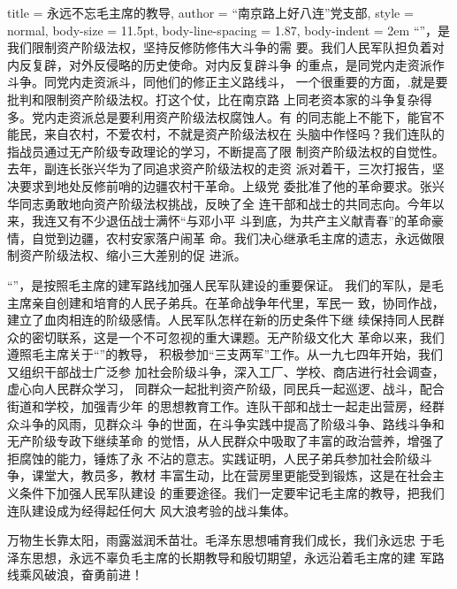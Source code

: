 \begin{hongqiarticle}{
        title  = {永远不忘毛主席的教导},
        author = {“南京路上好八连”党支部},
        style  = normal,
        body-size = 11.5pt,
        body-line-spacing = 1.87,
        body-indent = 2em
    }
    “”，是我们限制资产阶级法权，坚持反修防修伟大斗争的需
    要。我们人民军队担负着对内反复辟，对外反侵略的历史使命。对内反复辟斗争
    的重点，是同党内走资派作斗争。同党内走资派斗，同他们的修正主义路线斗，
    一个很重要的方面，.就是要批判和限制资产阶级法权。打这个仗，比在南京路
    上同老资本家的斗争复杂得多。党内走资派总是要利用资产阶级法权腐蚀人。有
    的同志能上不能下，能官不能民，来自农村，不爱农村，不就是资产阶级法权在
    头脑中作怪吗？我们连队的指战员通过无产阶级专政理论的学习，不断提高了限
    制资产阶级法权的自觉性。去年，副连长张兴华为了同追求资产阶级法权的走资
    派对着干，三次打报告，坚决要求到地处反修前哨的边疆农村干革命。上级党
    委批准了他的革命要求。张兴华同志勇敢地向资产阶级法权挑战，反映了全
    连干部和战士的共同志向。今年以来，我连又有不少退伍战士满怀“与邓小平
    斗到底，为共产主义献青春”的革命豪情，自觉到边疆，农村安家落户闹革
    命。我们决心继承毛主席的遗志，永远做限制资产阶级法权、缩小三大差别的促
    进派。
    
    “”，是按照毛主席的建军路线加强人民军队建设的重要保证。
    我们的军队，是毛主席亲自创建和培育的人民子弟兵。在革命战争年代里，军民一
    致，协同作战，建立了血肉相连的阶级感情。人民军队怎样在新的历史条件下继
    续保持同人民群众的密切联系，这是一个不可忽视的重大课题。无产阶级文化大
    革命以来，我们遵照毛主席关于“”的教导，
    积极参加“三支两军”工作。从一九七四年开始，我们又组织干部战士广泛参
    加社会阶级斗争，深入工厂、学校、商店进行社会调查，虚心向人民群众学习，
    同群众一起批判资产阶级，同民兵一起巡逻、战斗，配合街道和学校，加强青少年
    的思想教育工作。连队干部和战士一起走出营房，经群众斗争的风雨，见群众斗
    争的世面，在斗争实践中提高了阶级斗争、路线斗争和无产阶级专政下继续革命
    的觉悟，从人民群众中吸取了丰富的政治营养，增强了拒腐蚀的能力，锤炼了永
    不沾的意志。实践证明，人民子弟兵参加社会阶级斗争，课堂大，教员多，教材
    丰富生动，比在营房里更能受到锻炼，这是在社会主义条件下加强人民军队建设
    的重要途径。我们一定要牢记毛主席的教导，把我们连队建设成为经得起任何大
    风大浪考验的战斗集体。
    
    万物生长靠太阳，雨露滋润禾苗壮。毛泽东思想哺育我们成长，我们永远忠
    于毛泽东思想，永远不辜负毛主席的长期教导和殷切期望，永远沿着毛主席的建
    军路线乘风破浪，奋勇前进！
\end{hongqiarticle}